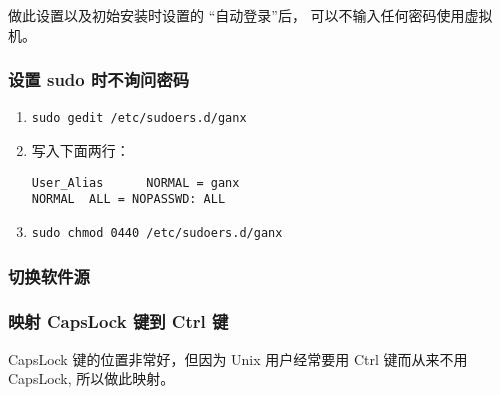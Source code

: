 \documentclass[
    11pt,
    cite=authoryear,
    device=phone,
    lang=cn,
    mode=simple,
    result=answer,
    toc=onecol,
]{elegantbook_sierxue}
\begin{document}
做此设置以及初始安装时设置的 ``自动登录''后，
可以不输入任何密码使用虚拟机。

\subsubsection{设置 sudo 时不询问密码}%
\label{ssub:vm-sudo}
\begin{enumerate}
    \item \lstinline{sudo gedit /etc/sudoers.d/ganx}
    \item 写入下面两行：
\begin{lstlisting}[escapeinside=``]
User_Alias      NORMAL = ganx
NORMAL  ALL = NOPASSWD: ALL
\end{lstlisting}
    \item \lstinline{sudo chmod 0440 /etc/sudoers.d/ganx}
\end{enumerate}

\subsubsection{切换软件源}%
\label{ssub:vm-source}

\subsubsection{映射 CapsLock 键到 Ctrl 键}%
\label{ssub:vm-caps-ctrl}

CapsLock 键的位置非常好，但因为 Unix 用户经常要用 Ctrl 键而从来不用 CapsLock,
所以做此映射。
\end{document}
